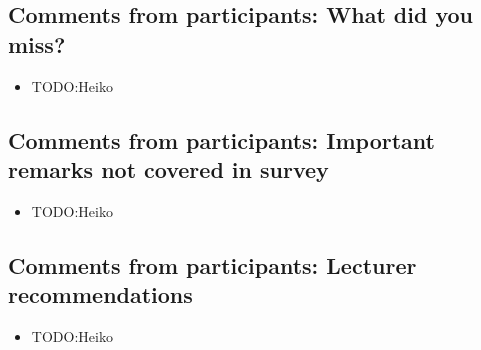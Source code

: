 \documentclass[11pt,a4paper]{article}
\numberwithin{equation}{section}
\numberwithin{table}{section}\setlength{\multlinegap}{25pt}
\begin{document}
\newpage

\subsection{Comments from participants: What did you miss?}
\begin{itemize}
\item TODO:Heiko
\end{itemize}

\subsection{Comments from participants: Important remarks not covered in survey}
\begin{itemize}
\item TODO:Heiko
\end{itemize}

\subsection{Comments from participants: Lecturer recommendations}
\begin{itemize}
\item TODO:Heiko
\end{itemize}
\end{document}
